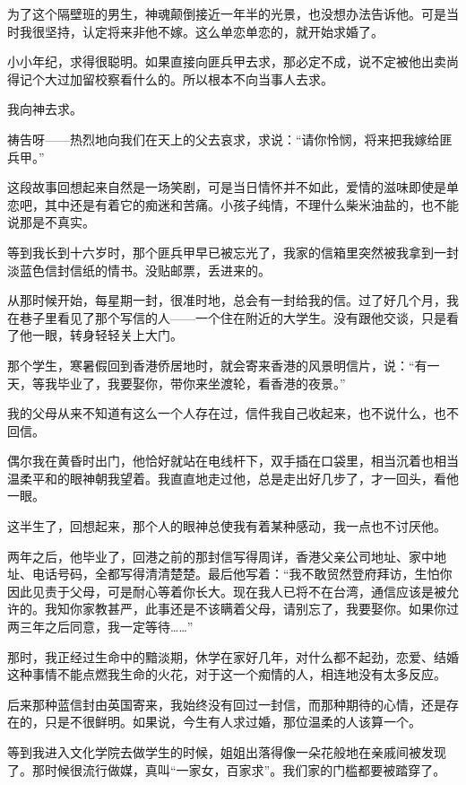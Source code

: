 \par 为了这个隔壁班的男生，神魂颠倒接近一年半的光景，也没想办法告诉他。可是当时我很坚持，认定将来非他不嫁。这么单恋单恋的，就开始求婚了。
\par 小小年纪，求得很聪明。如果直接向匪兵甲去求，那必定不成，说不定被他出卖尚得记个大过加留校察看什么的。所以根本不向当事人去求。
\par 我向神去求。
\par 祷告呀——热烈地向我们在天上的父去哀求，求说：“请你怜悯，将来把我嫁给匪兵甲。”
\par 这段故事回想起来自然是一场笑剧，可是当日情怀并不如此，爱情的滋味即使是单恋吧，其中还是有着它的痴迷和苦痛。小孩子纯情，不理什么柴米油盐的，也不能说那是不真实。
\par 等到我长到十六岁时，那个匪兵甲早已被忘光了，我家的信箱里突然被我拿到一封淡蓝色信封信纸的情书。没贴邮票，丢进来的。
\par 从那时候开始，每星期一封，很准时地，总会有一封给我的信。过了好几个月，我在巷子里看见了那个写信的人——一个住在附近的大学生。没有跟他交谈，只是看了他一眼，转身轻轻关上大门。
\par 那个学生，寒暑假回到香港侨居地时，就会寄来香港的风景明信片，说：“有一天，等我毕业了，我要娶你，带你来坐渡轮，看香港的夜景。”
\par 我的父母从来不知道有这么一个人存在过，信件我自己收起来，也不说什么，也不回信。
\par 偶尔我在黄昏时出门，他恰好就站在电线杆下，双手插在口袋里，相当沉着也相当温柔平和的眼神朝我望着。我直直地走过他，总是走出好几步了，才一回头，看他一眼。
\par 这半生了，回想起来，那个人的眼神总使我有着某种感动，我一点也不讨厌他。
\par 两年之后，他毕业了，回港之前的那封信写得周详，香港父亲公司地址、家中地址、电话号码，全都写得清清楚楚。最后他写着：“我不敢贸然登府拜访，生怕你因此见责于父母，可是耐心等着你长大。现在我人已将不在台湾，通信应该是被允许的。我知你家教甚严，此事还是不该瞒着父母，请别忘了，我要娶你。如果你过两三年之后同意，我一定等待……”
\par 那时，我正经过生命中的黯淡期，休学在家好几年，对什么都不起劲，恋爱、结婚这种事情不能点燃我生命的火花，对于这一个痴情的人，相连地没有太多反应。
\par 后来那种蓝信封由英国寄来，我始终没有回过一封信，而那种期待的心情，还是存在的，只是不很鲜明。如果说，今生有人求过婚，那位温柔的人该算一个。
\par 等到我进入文化学院去做学生的时候，姐姐出落得像一朵花般地在亲戚间被发现了。那时候很流行做媒，真叫“一家女，百家求”。我们家的门槛都要被踏穿了。
